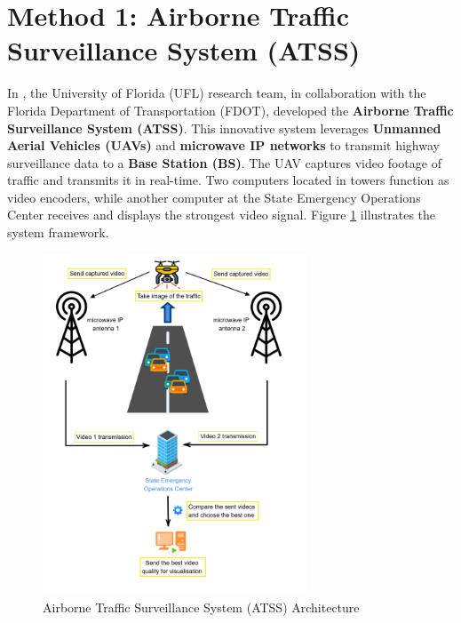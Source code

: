 \newpage

\section{Method 1: Airborne Traffic Surveillance System (ATSS)}
\label{sec:method1}

In \cite{srinivasan2004atss}, the University of Florida (UFL) research team, in collaboration with the Florida Department of Transportation (FDOT), developed the \textbf{Airborne Traffic Surveillance System (ATSS)}. This innovative system leverages \textbf{Unmanned Aerial Vehicles (UAVs)} and \textbf{microwave IP networks} to transmit highway surveillance data to a \textbf{Base Station (BS)}. The UAV captures video footage of traffic and transmits it in real-time. Two computers located in towers function as video encoders, while another computer at the State Emergency Operations Center receives and displays the strongest video signal. Figure \ref{fig:Methode_1_1} illustrates the system framework.

\begin{figure}[H]  
    \centering
    \includegraphics[width=0.7\textwidth]{Figures/Chapter3/Method1/1.png} %
    \caption{Airborne Traffic Surveillance System (ATSS) Architecture}
    \label{fig:Methode_1_1} %
\end{figure}

